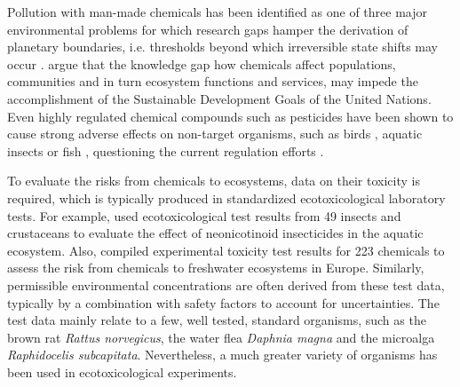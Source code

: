 \documentclass[journal,datadescriptor,submit,moreauthors,pdftex]{Definitions/mdpi}
\begin{document}
Pollution with man-made chemicals has been identified as one of three major environmental problems for which research gaps hamper the derivation of planetary boundaries, i.e. thresholds beyond which irreversible state shifts may occur \citep{steffen_anthropocene_2007, steffen_planetary_2015}. \citet{bernhardt_synthetic_2017} argue that the knowledge gap how chemicals affect populations, communities and in turn ecosystem functions and services, may impede the accomplishment of the Sustainable Development Goals \citep{rosa_transforming_2017} of the United Nations. Even highly regulated chemical compounds such as pesticides have been shown to cause strong adverse effects on non-target organisms, such as birds \citep{hallmann_declines_2014}, aquatic insects \citep{beketov_pesticides_2013} or fish \citep{yamamuro_neonicotinoids_2019}, questioning the current regulation efforts \citep{schafer_future_2019}.

To evaluate the risks from chemicals to ecosystems, data on their toxicity is required, which is typically produced in standardized ecotoxicological laboratory tests. For example, \citet{morrissey_neonicotinoid_2015} used ecotoxicological test results from 49 insects and crustaceans to evaluate the effect of neonicotinoid insecticides in the aquatic ecosystem. Also, \citet{malaj_organic_2014} compiled experimental toxicity test results for 223 chemicals to assess the risk from chemicals to freshwater ecosystems in Europe. Similarly, permissible environmental concentrations are often derived from these test data, typically by a combination with safety factors to account for uncertainties. The test data mainly relate to a few, well tested, standard organisms, such as the brown rat \textit{Rattus norvegicus}, the water flea \textit{Daphnia magna} and the microalga \textit{Raphidocelis subcapitata}. Nevertheless, a much greater variety of organisms has been used in ecotoxicological experiments.
\end{document}
